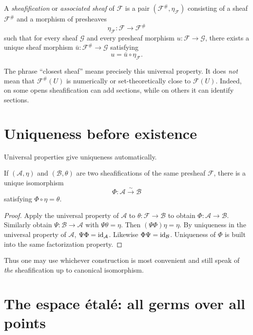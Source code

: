 \begin{definition}[Sheafification]
A \emph{sheafification} or \emph{associated sheaf} of $\mathcal F$ is a pair
$(\mathcal F^\#,\eta_{\mathcal F})$ consisting of a sheaf $\mathcal F^\#$ and a morphism of
presheaves
\[
\eta_{\mathcal F}:\mathcal F\longrightarrow\mathcal F^\#
\]
such that for every sheaf $\mathcal G$ and every presheaf morphism
$u:\mathcal F\to\mathcal G$, there exists a unique sheaf morphism
$\bar u:\mathcal F^\#\to\mathcal G$ satisfying
\[
 u=\bar u\circ\eta_{\mathcal F}.
\]
\end{definition}



The phrase ``closest sheaf'' means precisely this universal property.  It does \emph{not}
mean that $\mathcal F^\#(U)$ is numerically or set-theoretically close to $\mathcal F(U)$.
Indeed, on some opens sheafification can add sections, while on others it can identify
sections.

\section{Uniqueness before existence}

Universal properties give uniqueness automatically.

\begin{theorem}
If $(\mathcal A,\eta)$ and $(\mathcal B,\theta)$ are two sheafifications of the same
presheaf $\mathcal F$, there is a unique isomorphism
\[
\Phi:\mathcal A\xrightarrow{\sim}\mathcal B
\]
satisfying $\Phi\circ\eta=\theta$.
\end{theorem}
\begin{proof}
Apply the universal property of $\mathcal A$ to $\theta:\mathcal F\to\mathcal B$ to obtain
$\Phi:\mathcal A\to\mathcal B$.  Similarly obtain $\Psi:\mathcal B\to\mathcal A$ with
$\Psi\theta=\eta$.  Then $(\Psi\Phi)\eta=\eta$.  By uniqueness in the universal property
of $\mathcal A$, $\Psi\Phi=\operatorname{id}_{\mathcal A}$.  Likewise $\Phi\Psi=\operatorname{id}_{\mathcal B}$.
Uniqueness of $\Phi$ is built into the same factorization property.
\end{proof}

Thus one may use whichever construction is most convenient and still speak of
\emph{the} sheafification up to canonical isomorphism.

\section{The espace \texorpdfstring{\'{e}tal\'{e}}{etale}: all germs over all points}

